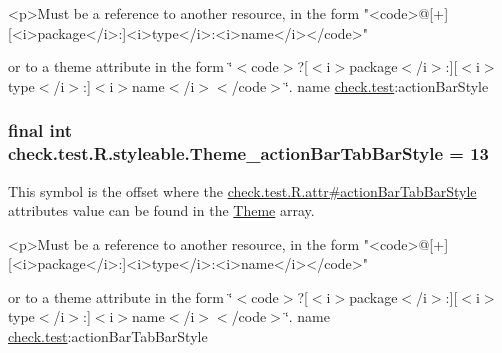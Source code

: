 \begin{DoxyVerb}      <p>Must be a reference to another resource, in the form "<code>@[+][<i>package</i>:]<i>type</i>:<i>name</i></code>"
\end{DoxyVerb}
 or to a theme attribute in the form \char`\"{}$<$code$>$?\mbox{[}$<$i$>$package$<$/i$>$\+:\mbox{]}\mbox{[}$<$i$>$type$<$/i$>$\+:\mbox{]}$<$i$>$name$<$/i$>$$<$/code$>$\char`\"{}.  name \hyperlink{namespacecheck_1_1test}{check.\+test}\+:action\+Bar\+Style \hypertarget{classcheck_1_1test_1_1_r_1_1styleable_a4f15c7fba5e3c2d9c43d6e29262b809b}{}
\subsubsection[{Theme\+\_\+action\+Bar\+Tab\+Bar\+Style}]{\setlength{\rightskip}{0pt plus 5cm}final int check.\+test.\+R.\+styleable.\+Theme\+\_\+action\+Bar\+Tab\+Bar\+Style = 13\hspace{0.3cm}{\ttfamily [static]}}\label{classcheck_1_1test_1_1_r_1_1styleable_a4f15c7fba5e3c2d9c43d6e29262b809b}
This symbol is the offset where the \hyperlink{classcheck_1_1test_1_1_r_1_1attr_a87898eccbaa7fa385bf19395d0a5b922}{check.\+test.\+R.\+attr\#action\+Bar\+Tab\+Bar\+Style} attribute\textquotesingle{}s value can be found in the \hyperlink{classcheck_1_1test_1_1_r_1_1styleable_acca726d02016a0cf607782ec3a436a81}{Theme} array.

\begin{DoxyVerb}      <p>Must be a reference to another resource, in the form "<code>@[+][<i>package</i>:]<i>type</i>:<i>name</i></code>"
\end{DoxyVerb}
 or to a theme attribute in the form \char`\"{}$<$code$>$?\mbox{[}$<$i$>$package$<$/i$>$\+:\mbox{]}\mbox{[}$<$i$>$type$<$/i$>$\+:\mbox{]}$<$i$>$name$<$/i$>$$<$/code$>$\char`\"{}.  name \hyperlink{namespacecheck_1_1test}{check.\+test}\+:action\+Bar\+Tab\+Bar\+Style \hypertarget{classcheck_1_1test_1_1_r_1_1styleable_ac7c5d9db6774de90f8feae957a5c9525}{}
